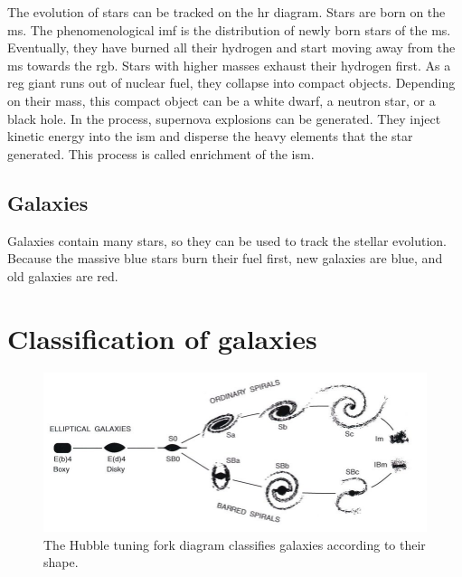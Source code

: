 The evolution of stars can be tracked on the \ac{hr} diagram.
Stars are born on the \ac{ms}.
The phenomenological \ac{imf} is the distribution of newly born stars of the \ac{ms}.
Eventually, they have burned all their hydrogen and start moving away from the \ac{ms} towards the \ac{rgb}.
Stars with higher masses exhaust their hydrogen first.
As a reg giant runs out of nuclear fuel, they collapse into compact objects. Depending on their mass, this compact object can be a white dwarf, a neutron star, or a black hole.
In the process, supernova explosions can be generated.
They inject kinetic energy into the \ac{ism} and disperse the heavy elements that the star generated.
This process is called enrichment of the \ac{ism}.


\subsection{Galaxies}
Galaxies contain many stars, so they can be used to track the stellar evolution.
Because the massive blue stars burn their fuel first, new galaxies are blue, and old galaxies are red.



\section{Classification of galaxies}

\begin{figure}
	\includegraphics[width=\textwidth]{img/ch-05/tuning-fork.jpg}
	\caption{The Hubble tuning fork diagram classifies galaxies according to their shape.}
	\label{fig:tuning-fork}
\end{figure}


